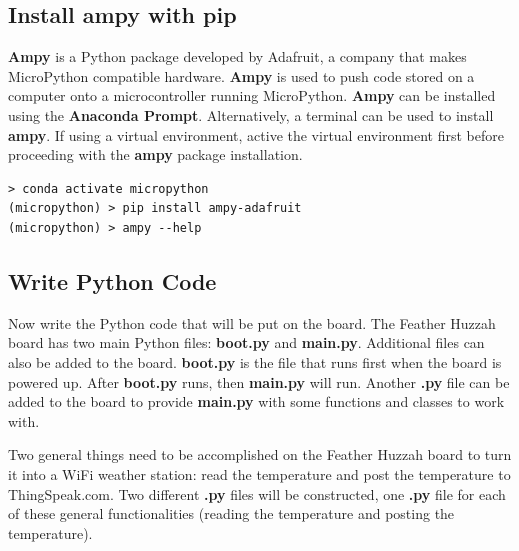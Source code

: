\documentclass{book}
\begin{document}
    
        \subsection{Install ampy with pip}\label{install-ampy-with-pip}

\textbf{Ampy} is a Python package developed by Adafruit, a company that
makes MicroPython compatible hardware. \textbf{Ampy} is used to push
code stored on a computer onto a microcontroller running MicroPython.
\textbf{Ampy} can be installed using the \textbf{Anaconda Prompt}.
Alternatively, a terminal can be used to install \textbf{ampy}. If using
a virtual environment, active the virtual environment first before
proceeding with the \textbf{ampy} package installation.
    




    
        \begin{lstlisting}
> conda activate micropython
(micropython) > pip install ampy-adafruit
(micropython) > ampy --help
\end{lstlisting}
    




    
        \subsection{Write Python Code}\label{write-python-code}
    




    
        Now write the Python code that will be put on the board. The Feather
Huzzah board has two main Python files: \textbf{boot.py} and
\textbf{main.py}. Additional files can also be added to the board.
\textbf{boot.py} is the file that runs first when the board is powered
up. After \textbf{boot.py} runs, then \textbf{main.py} will run. Another
\textbf{.py} file can be added to the board to provide \textbf{main.py}
with some functions and classes to work with.

Two general things need to be accomplished on the Feather Huzzah board
to turn it into a WiFi weather station: read the temperature and post
the temperature to ThingSpeak.com. Two different \textbf{.py} files will
be constructed, one \textbf{.py} file for each of these general
functionalities (reading the temperature and posting the temperature).
\end{document}
